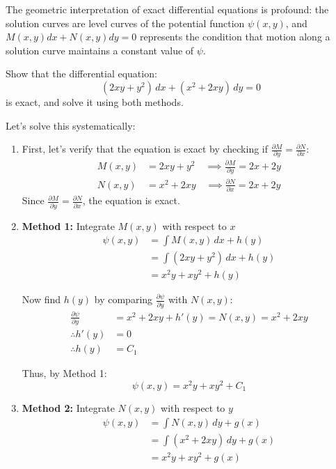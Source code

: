 \noindent The geometric interpretation of exact differential equations is profound: the solution curves are level curves of the potential function $\psi(x,y)$, and $M(x,y)dx + N(x,y)dy = 0$ represents the condition that motion along a solution curve maintains a constant value of $\psi$.

\exampleline
\begin{example}
Show that the differential equation:
\[
(2xy + y^2)\,dx + (x^2 + 2xy)\,dy = 0
\]
is exact, and solve it using both methods.

\begin{solution}
Let's solve this systematically:

\begin{enumerate}
\item First, let's verify that the equation is exact by checking if $\frac{\partial M}{\partial y} = \frac{\partial N}{\partial x}$:
   \begin{align*}
   M(x,y) &= 2xy + y^2 \quad \implies \frac{\partial M}{\partial y} = 2x + 2y \\
   N(x,y) &= x^2 + 2xy \quad \implies \frac{\partial N}{\partial x} = 2x + 2y
   \end{align*}
   Since $\frac{\partial M}{\partial y} = \frac{\partial N}{\partial x}$, the equation is exact.

\item \textbf{Method 1:} Integrate $M(x,y)$ with respect to $x$
   \begin{align*}
   \psi(x,y) &= \int M(x,y)\,dx + h(y) \\
   &= \int (2xy + y^2)\,dx + h(y) \\
   &= x^2y + xy^2 + h(y)
   \end{align*}
   
   Now find $h(y)$ by comparing $\frac{\partial \psi}{\partial y}$ with $N(x,y)$:
   \begin{align*}
   \frac{\partial \psi}{\partial y} &= x^2 + 2xy + h'(y) = N(x,y) = x^2 + 2xy \\
   \therefore h'(y) &= 0 \\
   \therefore h(y) &= C_1
   \end{align*}
   
   Thus, by Method 1:
   \[
   \psi(x,y) = x^2y + xy^2 + C_1
   \]

\item \textbf{Method 2:} Integrate $N(x,y)$ with respect to $y$
   \begin{align*}
   \psi(x,y) &= \int N(x,y)\,dy + g(x) \\
   &= \int (x^2 + 2xy)\,dy + g(x) \\
   &= x^2y + xy^2 + g(x)
   \end{align*}
   

\end{enumerate}
\end{solution}
\end{example}
